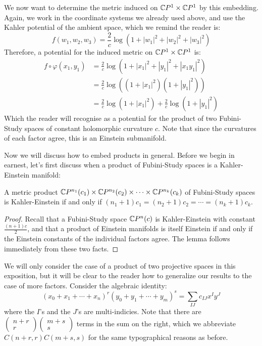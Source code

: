 \begin{example}
We now want to determine the metric induced on $\mathbb{C}P^1 \times \mathbb{C}P^1$ by this embedding.  Again, we work in the coordinate systems we already used above, and use the Kahler potential of the ambient space, which we remind the reader is:
%
$$ f(w_1,w_2,w_3) = \frac{2}{c} \log ( 1 + |w_1|^2 + |w_2|^2 + |w_3|^2 ) $$
%
Therefore, a potential for the induced metric on $\mathbb{C}P^1 \times \mathbb{C}P^1$ is:
%
\begin{align*}
f \circ \varphi ( x_1, y_1 ) &= \frac{2}{c} \log ( 1 + |x_1|^2 + |y_1|^2 + |x_1 y_1|^2 ) \\
&= \frac{2}{c} \log ( (1 + |x_1|^2) (1 + |y_1|^2 ) ) \\
&= \frac{2}{c} \log ( 1 + |x_1|^2 ) + \frac{2}{c} \log ( 1 + |y_1|^2 )
\end{align*}
%
Which the reader will recognise as a potential for the product of two Fubini-Study spaces of constant holomorphic curvature $c$.  Note that since the curvatures of each factor agree, this is an Einstein submanifold.
\end{example}

Now we will discuss how to embed products in general.  Before we begin in earnest, let's first discuss when a product of Fubini-Study spaces is a Kahler-Einstein manifold:

\begin{lem}
A metric product $\mathbb{C}P^{n_1}(c_1) \times \mathbb{C}P^{n_2}(c_2) \times \cdots \times \mathbb{C}P^{n_k}(c_k)$ of Fubini-Study spaces is Kahler-Einstein if and only if $(n_1 + 1) c_1 = (n_2 + 1) c_2 = \cdots = (n_k + 1) c_k$.
\end{lem}

\begin{proof}
Recall that a Fubini-Study space $\mathbb{C}P^n(c)$ is Kahler-Einstein with constant $\frac{(n+1)c}{2}$, and that a product of Einstein manifolds is itself Einstein if and only if the Einstein constants of the individual factors agree.  The lemma follows immediately from these two facts.
\end{proof}

We will only consider the case of a product of two projective spaces in this exposition, but it will be clear to the reader how to generalize our results to the case of more factors.  Consider the algebraic identity:
%
$$ (x_0 + x_1 + \cdots + x_n)^r (y_0 + y_1 + \cdots + y_m)^s = \sum_{IJ} c_{IJ} x^I y^J $$
%
where the $I$'s and the $J$'s are multi-indicies.  Note that there are $\left( \begin{array}{c} n  + r \\ r \end{array} \right) \left( \begin{array}{c} m + s \\ s \end{array} \right)$ terms in the sum on the right, which we abbreviate $C(n + r, r) C( m + s, s)$ for the same typographical reasons as before.  

